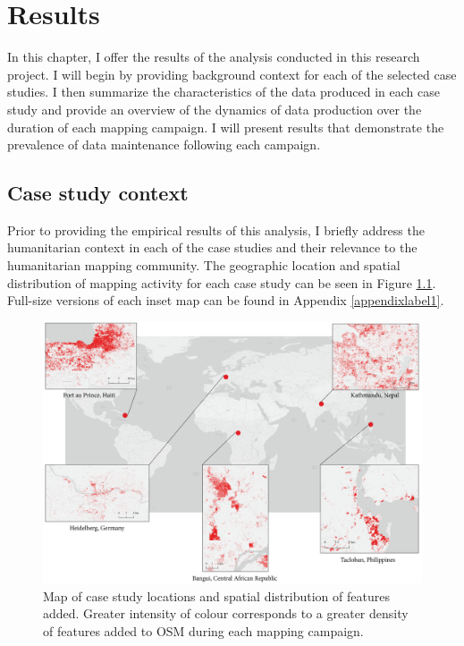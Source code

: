\chapter{Results}
\label{chapterlabel5}

In this chapter, I offer the results of the analysis conducted in this research project. I will begin by providing background context for each of the selected case studies. I then summarize the characteristics of the data produced in each case study and provide an overview of the dynamics of data production over the duration of each mapping campaign. I will present results that demonstrate the prevalence of data maintenance following each campaign. 

\section{Case study context}

Prior to providing the empirical results of this analysis, I briefly address the humanitarian context in each of the case studies and their relevance to the humanitarian mapping community. The geographic location and spatial distribution of mapping activity for each case study can be seen in Figure \ref{fig:map}. Full-size versions of each inset map can be found in Appendix \ref{appendixlabel1}. 

\begin{figure} %
    \centering %
    \includegraphics[width = \textwidth]{Images/sum_map.png} %
    \caption[Map of case study locations and spatial distribution of features added.]{Map of case study locations and spatial distribution of features added. Greater intensity of colour corresponds to a greater density of features added to OSM during each mapping campaign.} %
    \label{fig:map} %
\end{figure}

